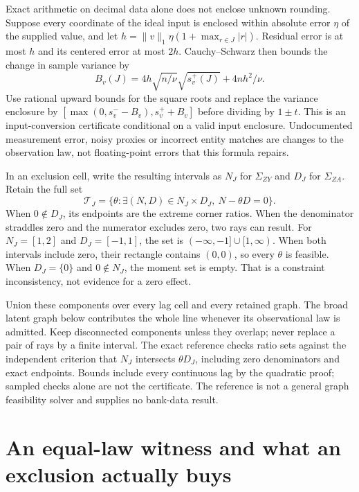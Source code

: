 Exact arithmetic on decimal data alone does not enclose unknown
rounding. Suppose every coordinate of the ideal input is enclosed within
absolute error \(\eta\) of the supplied value, and let
\(h=\|v\|_1\eta(1+\max_{r\in J}|r|)\). Residual error is at most \(h\)
and its centered error at most \(2h\). Cauchy--Schwarz then bounds the
change in sample variance by \[
 B_v(J)=4h\sqrt{n/\nu}\sqrt{s^+_v(J)}+4nh^2/\nu.
\] Use rational upward bounds for the square roots and replace the
variance enclosure by \([\max(0,s^-_v-B_v),s^+_v+B_v]\) before dividing
by \(1\pm t\). This is an input-conversion certificate conditional on a
valid input enclosure. Undocumented measurement error, noisy proxies or
incorrect entity matches are changes to the observation law, not
floating-point errors that this formula repairs.

In an exclusion cell, write the resulting intervals as \(N_J\) for
\(\Sigma_{ZY}\) and \(D_J\) for \(\Sigma_{ZA}\). Retain the full set \[
 \mathcal T_J=\{\theta:\exists (N,D)\in N_J\times D_J,
                      \ N-\theta D=0\}.
\] When \(0\notin D_J\), its endpoints are the extreme corner ratios.
When the denominator straddles zero and the numerator excludes zero, two
rays can result. For \(N_J=[1,2]\) and \(D_J=[-1,1]\), the set is
\(( -\infty,-1]\cup[1,\infty)\). When both intervals include zero, their
rectangle contains \((0,0)\), so every \(\theta\) is feasible. When
\(D_J=\{0\}\) and \(0\notin N_J\), the moment set is empty. That is a
constraint inconsistency, not evidence for a zero effect.

Union these components over every lag cell and every retained graph. The
broad latent graph below contributes the whole line whenever its
observational law is admitted. Keep disconnected components unless they
overlap; never replace a pair of rays by a finite interval. The exact
reference checks ratio sets against the independent criterion that
\(N_J\) intersects \(\theta D_J\), including zero denominators and exact
endpoints. Bounds include every continuous lag by the quadratic proof;
sampled checks alone are not the certificate. The reference is not a
general graph feasibility solver and supplies no bank-data result.

\hypertarget{an-equal-law-witness-and-what-an-exclusion-actually-buys}{%
\section{An equal-law witness and what an exclusion actually
buys}\label{an-equal-law-witness-and-what-an-exclusion-actually-buys}}

